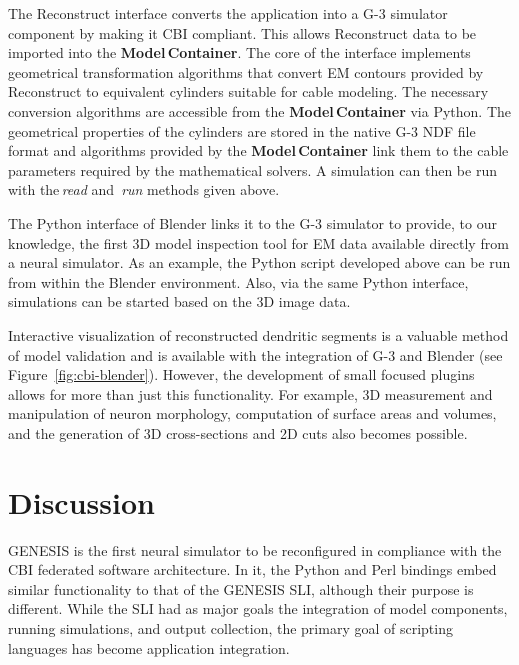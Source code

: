 \documentclass[10pt]{article}
\begin{document}
The Reconstruct interface converts the application
into a G-3 simulator component by making it CBI compliant. This allows
Reconstruct data to be imported into the {\bf Model\,Container}.
The core of the interface implements geometrical transformation
algorithms that convert EM contours provided by Reconstruct to
equivalent cylinders suitable for cable modeling. The necessary conversion algorithms are accessible from the
{\bf Model\,Container} via Python.
The geometrical properties of the cylinders are stored in the native
G-3 NDF file format and algorithms provided by the {\bf Model\,Container}
link them to the cable parameters required by the mathematical
solvers.  A simulation can then be run with the\,{\it read} and\,{\it
  run} methods given above.

The Python interface of Blender links it to the G-3 simulator to
provide, to our knowledge, the first 3D model inspection tool for EM
data available directly from a neural simulator.  As an example, the
Python script developed above can be run from within the Blender
environment.  Also, via the same Python interface, simulations can be
started based on the 3D image data.

Interactive visualization of reconstructed dendritic segments is a
valuable method of model validation and is available with the
integration of G-3 and Blender (see Figure~\ref{fig:cbi-blender}).
However, the development of small focused plugins allows for more than
just this functionality. For example, 3D measurement and manipulation of
neuron morphology, computation of surface areas and volumes, and the
generation of 3D cross-sections and 2D cuts also becomes possible.

\section*{Discussion}

GENESIS is the first neural simulator to be reconfigured in compliance
with the CBI federated software architecture. In it, the Python and Perl bindings embed similar
functionality to that of the GENESIS SLI, although their purpose is different.
While the SLI had as major goals the integration of model components,
running simulations, and output collection, the primary goal of
scripting languages has become application
integration.
\end{document}
